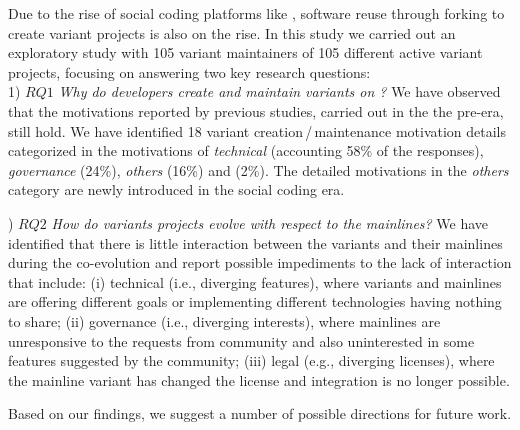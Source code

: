 Due to the rise of social coding platforms like \gh, software reuse through forking to create variant projects is also on the rise.
In this study we carried out an exploratory study with 105 variant maintainers of 105 different active variant projects, focusing on answering two key research questions:\\
1) $RQ1$ \textit{Why do developers create and maintain variants on \gh?}
We have observed that the motivations reported by previous studies, carried out in the the pre-\gh era, still hold. We have identified 18 variant creation\,/\,maintenance motivation details categorized in the motivations of \emph{technical} (accounting 58\% of the responses), \emph{governance} (24\%), \emph{others} (16\%) and  (2\%). The detailed motivations in the \emph{others} category are newly introduced in the social coding era.

) $RQ2$ \textit{How do variants projects evolve with respect to the mainlines?}
We have identified that there is little interaction between the variants and their mainlines during the co-evolution and report possible impediments to the lack of interaction that include: (i) technical (i.e., diverging features), where variants and mainlines are offering different goals or implementing different technologies having nothing to share; (ii) governance (i.e., diverging interests), where mainlines are unresponsive to the requests from community and also uninterested in some features suggested by the community; (iii) legal (e.g., diverging licenses), where the mainline variant has changed the license and integration is no longer possible.

Based on our findings, we suggest a number of possible directions for future work.

